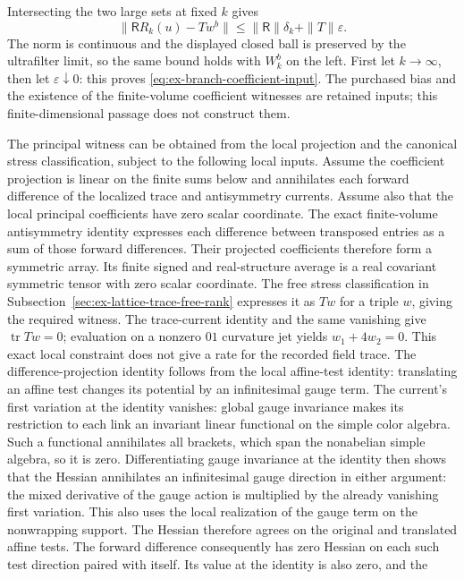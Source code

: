 Intersecting the two large sets at fixed $k$ gives
\[
 \|\mathsf R R_k(u)-T w^b\|
 \le \|\mathsf R\|\delta_k+\|T\|\varepsilon.
\]
The norm is continuous and the displayed closed ball is preserved by the
ultrafilter limit, so the same bound holds with $W^b_k$ on the left.
First let $k\to\infty$, then let $\varepsilon\downarrow0$: this proves
\eqref{eq:ex-branch-coefficient-input}. The purchased bias and the existence
of the finite-volume coefficient witnesses are retained inputs; this
finite-dimensional passage does not construct them.

The principal witness can be obtained from the local projection and the
canonical stress classification, subject to the following local inputs.
Assume the coefficient projection is linear on the finite sums below and
annihilates each forward difference of the localized trace and
antisymmetry currents. Assume also that the local principal coefficients
have zero scalar coordinate. The exact finite-volume antisymmetry identity
expresses each difference between transposed entries as a sum of those
forward differences. Their projected coefficients therefore form a
symmetric array. Its finite signed and real-structure average is a real
covariant symmetric tensor with zero scalar coordinate. The free stress
classification in Subsection~\ref{sec:ex-lattice-trace-free-rank} expresses it
as $T w$ for a triple $w$, giving the required witness. The trace-current
identity and the same vanishing give $\operatorname{tr}Tw=0$; evaluation on
a nonzero $01$ curvature jet yields $w_1+4w_2=0$. This exact local constraint
does not give a rate for the recorded field trace. The difference-projection
identity follows from the local affine-test identity: translating an affine test changes its potential by an infinitesimal
gauge term. The current's first variation at the identity vanishes: global
gauge invariance makes its restriction to each link an invariant linear
functional on the simple color algebra. Such a functional annihilates all
brackets, which span the nonabelian simple algebra, so it is zero. Differentiating gauge
invariance at the identity then shows that the Hessian annihilates an
infinitesimal gauge direction in either argument: the mixed derivative of
the gauge action is multiplied by the already vanishing first variation.
This also uses the local
realization of the gauge term on the nonwrapping support.
The Hessian therefore agrees on the original and translated affine tests.
The forward difference consequently has zero Hessian on each such test
direction paired with itself. Its value at the identity is also zero, and the
